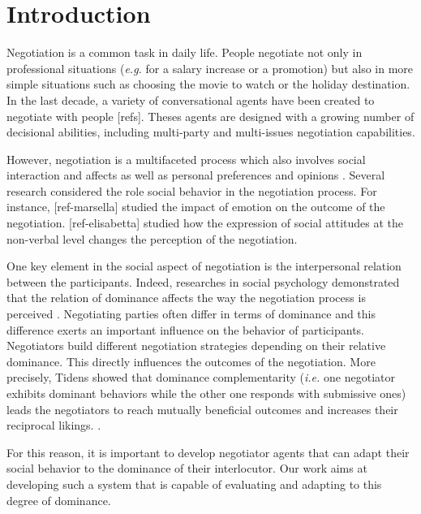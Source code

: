 \documentclass[conference, letterpaper]{IEEEtran}
\begin{document}
\section{Introduction}
Negotiation is a common task in daily life. People negotiate not only in professional situations (\emph{e.g.} for a salary increase or a promotion) but also in more simple situations such as choosing the movie to watch or the holiday destination. In the last decade, a variety of conversational agents have been created to negotiate with people [refs]. Theses agents are designed with a growing number of decisional abilities, including multi-party and multi-issues negotiation capabilities.

However, negotiation is a multifaceted process which also involves social interaction and affects as well as personal preferences and opinions  \cite{bro2010affective}. Several research considered the role social behavior in the negotiation process. For instance, [ref-marsella] studied the impact of emotion on the outcome of the negotiation. [ref-elisabetta] studied how the expression of social attitudes at the non-verbal level changes the perception of the negotiation.

One key element in the social aspect of negotiation is the interpersonal relation between the participants. Indeed, researches in social psychology demonstrated that the relation of dominance affects the way the negotiation process is perceived \cite{van2006power}. Negotiating parties often differ in terms of dominance and this difference exerts an important influence on the behavior of participants. Negotiators build different negotiation strategies depending on their relative dominance. This directly influences the outcomes of the negotiation. More precisely, Tidens \cite{tiedens2003power} showed that dominance complementarity (\emph{i.e.} one negotiator exhibits dominant behaviors while the other one responds with submissive ones) leads the negotiators to reach mutually beneficial outcomes and increases their reciprocal likings. \cite{wiltermuth2015benefits,tiedens2003power}.

For this reason, it is important to develop negotiator agents that can adapt their social behavior to the dominance of their interlocutor. Our work aims at developing such a system that is capable of evaluating and adapting to this degree of dominance.
\end{document}
